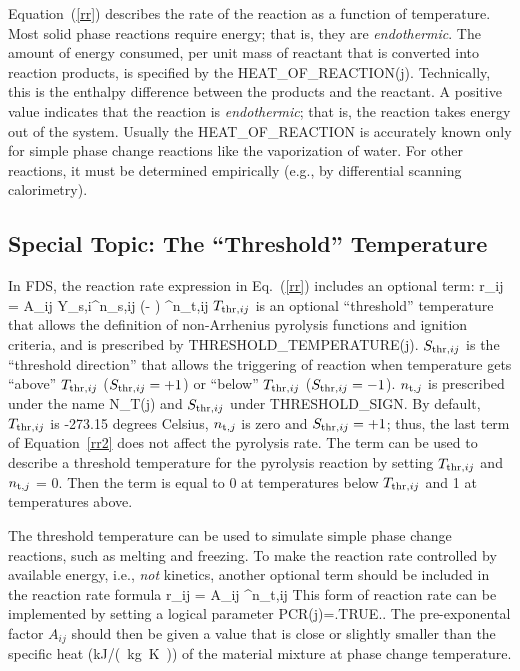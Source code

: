 \documentclass[11pt]{book}
\begin{document}
Equation~(\ref{rr}) describes the rate of the reaction as a function of temperature.  Most solid phase reactions require energy; that is, they are {\em endothermic}. The amount of energy consumed, per unit mass of reactant that is converted into reaction products, is specified by the {\ct HEAT\_OF\_REACTION(j)}. Technically, this is the enthalpy difference between the products and the reactant. A positive value indicates that the reaction is {\em endothermic}; that is, the reaction takes energy out of the system. Usually the {\ct HEAT\_OF\_REACTION} is accurately known only for simple phase change reactions like the vaporization of water. For other reactions, it must be determined empirically (e.g., by differential scanning calorimetry).


\subsection{Special Topic: The ``Threshold'' Temperature}
\label{info:threshold_temperature}

In FDS, the reaction rate expression in Eq.~(\ref{rr}) includes an optional term:
\be
  r_{ij} = A_{ij} \; Y_{{\rm s},i}^{n_{{\rm s},ij}} \; \exp \left(- \right) \;
  \max{}^{n_{{\rm t},ij}}
  \label{rr2}
\ee
$T_{{\rm thr},ij}$ is an optional ``threshold'' temperature that allows the definition of non-Arrhenius pyrolysis functions and ignition criteria, and is prescribed by {\ct THRESHOLD\_TEMPERATURE(j)}. $S_{{\rm thr},ij}$ is the ``threshold direction'' that allows the triggering of reaction when temperature gets ``above'' $T_{{\rm thr},ij}$ ($S_{{\rm thr},ij}=+1$) or ``below'' $T_{{\rm thr},ij}$ ($S_{{\rm thr},ij}=-1$). $n_{{\rm t},j}$ is prescribed under the name {\ct N\_T(j)} and $S_{{\rm thr},ij}$ under {\ct THRESHOLD\_SIGN}. By default, $T_{{\rm thr},ij}$ is -273.15 degrees Celsius, $n_{{\rm t},j}$ is zero and $S_{{\rm thr},ij}=+1$; thus, the last term of Equation~\ref{rr2} does not affect the pyrolysis rate. The term can be used to describe a threshold temperature for the pyrolysis reaction by setting $T_{{\rm thr},ij}$ and $n_{{\rm t},j}$ = 0. Then the term is equal to 0 at temperatures below $T_{{\rm thr},ij}$ and 1 at temperatures above.

The threshold temperature can be used to simulate simple phase change reactions, such as melting and freezing. To make the reaction rate controlled by available energy, i.e., {\em not} kinetics, another optional term should be included in the reaction rate formula
\be
  r_{ij} = A_{ij} \max{}^{n_{{\rm t},ij}}
  \label{rr3}
\ee
This form of reaction rate can be implemented by setting a logical parameter {\ct PCR(j)=.TRUE.}. The pre-exponental factor $A_{ij}$ should then be given a value that is close or slightly smaller than the specific heat (\si{kJ/(kg.K)}) of the material mixture at phase change temperature.
\end{document}
